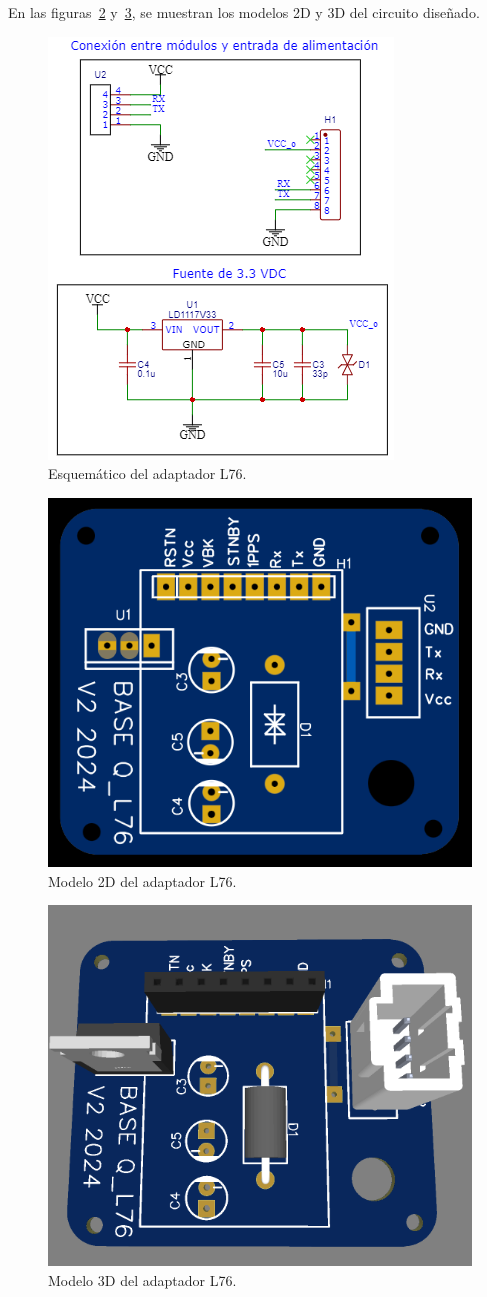 En las figuras~\ref{fig:adap_L76_2d} y~\ref{fig:adap_L76_3d}, se muestran los modelos 2D y 3D del circuito diseñado. 

\begin{figure}[htbp]
	\centering
	\includegraphics[width=.6\textwidth]{./Figures/QL76_Esquematico.png}
	\caption{Esquemático del adaptador L76.}
	\label{fig:adap_L76}
\end{figure}

\begin{figure}[htbp]
	\centering
	\includegraphics[width=.4\textwidth]{./Figures/QL76_modelo_2d_sup.png}
	\caption{Modelo 2D del adaptador L76.}
	\label{fig:adap_L76_2d}
\end{figure}

\begin{figure}[htbp]
	\centering
	\includegraphics[width=.4\textwidth]{./Figures/QL76_modelo_3d_sup.png}
	\caption{Modelo 3D del adaptador L76.}
	\label{fig:adap_L76_3d}
\end{figure}



